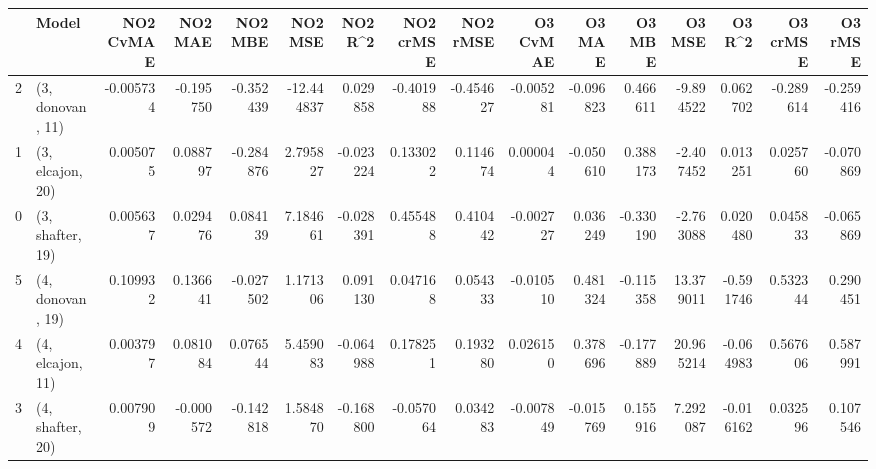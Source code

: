 \begin{tabular}{llrrrrrrrrrrrrrr}
\toprule
{} &             Model &  NO2 CvMAE &   NO2 MAE &   NO2 MBE &    NO2 MSE &   NO2 R\textasciicircum2 &  NO2 crMSE &  NO2 rMSE &  O3 CvMAE &    O3 MAE &    O3 MBE &     O3 MSE &    O3 R\textasciicircum2 &  O3 crMSE &   O3 rMSE \\
\midrule
2 &  (3, donovan, 11) &  -0.005734 & -0.195750 & -0.352439 & -12.444837 &  0.029858 &  -0.401988 & -0.454627 & -0.005281 & -0.096823 &  0.466611 &  -9.894522 &  0.062702 & -0.289614 & -0.259416 \\
1 &  (3, elcajon, 20) &   0.005075 &  0.088797 & -0.284876 &   2.795827 & -0.023224 &   0.133022 &  0.114674 &  0.000044 & -0.050610 &  0.388173 &  -2.407452 &  0.013251 &  0.025760 & -0.070869 \\
0 &  (3, shafter, 19) &   0.005637 &  0.029476 &  0.084139 &   7.184661 & -0.028391 &   0.455488 &  0.410442 & -0.002727 &  0.036249 & -0.330190 &  -2.763088 &  0.020480 &  0.045833 & -0.065869 \\
5 &  (4, donovan, 19) &   0.109932 &  0.136641 & -0.027502 &   1.171306 &  0.091130 &   0.047168 &  0.054333 & -0.010510 &  0.481324 & -0.115358 &  13.379011 & -0.591746 &  0.532344 &  0.290451 \\
4 &  (4, elcajon, 11) &   0.003797 &  0.081084 &  0.076544 &   5.459083 & -0.064988 &   0.178251 &  0.193280 &  0.026150 &  0.378696 & -0.177889 &  20.965214 & -0.064983 &  0.567606 &  0.587991 \\
3 &  (4, shafter, 20) &   0.007909 & -0.000572 & -0.142818 &   1.584870 & -0.168800 &  -0.057064 &  0.034283 & -0.007849 & -0.015769 &  0.155916 &   7.292087 & -0.016162 &  0.032596 &  0.107546 \\
\bottomrule
\end{tabular}
